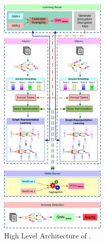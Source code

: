 \begin{figure}[t!]
    \centering
    \includegraphics[width=0.45\textwidth]{fig/arch.pdf}
    \caption{High Level Architecture of \Sys.}
    \vspace{-3ex}
    \label{arch}
  \end{figure}
